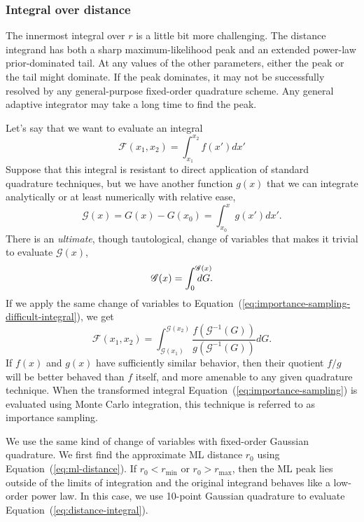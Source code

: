 \documentclass[amsmath,amssymb,aps,prx,reprint,nopreprintnumbers,nofootinbib]{revtex4-1}
\def\mathrlap{\mathpalette\mathrlapinternal}
\def\mathrlapinternal#1#2{\rlap{$\mathsurround=0pt#1{#2}$}}
\begin{document}
\subsubsection{Integral over distance}

The innermost integral over $r$ is a little bit more challenging. The distance integrand has both a sharp maximum\nobreakdashes-likelihood peak and an extended power\nobreakdashes-law prior\nobreakdashes-dominated tail. At any values of the other parameters, either the peak or the tail might dominate. If the peak dominates, it may not be successfully resolved by any general\nobreakdashes-purpose fixed\nobreakdashes-order quadrature scheme. Any general adaptive integrator may take a long time to find the peak.

Let's say that we want to evaluate an integral
%
\begin{equation}\label{eq:importance-sampling-difficult-integral}
    \mathscr{F}(x_1, x_2) = \int_{x_1}^{x_2} f(x') dx'
\end{equation}
%
Suppose that this integral is resistant to direct application of standard quadrature techniques, but we have another function $g(x)$ that we can integrate analytically or at least numerically with relative ease,
%
\begin{equation}
    \mathscr{G}(x) = G(x) - G(x_0) = \int_{x_0}^x g(x') dx'.
\end{equation}
%
There is an \emph{ultimate}, though tautological, change of variables that makes it trivial to evaluate $\mathscr{G}(x)$,
%
\begin{equation}
    \mathscr{G}(x) = \int_0^{\mathrlap{\mathscr{G}(x)}} dG.
\end{equation}
%
If we apply the same change of variables to Equation~(\ref{eq:importance-sampling-difficult-integral}), we get
%
\begin{equation}\label{eq:importance-sampling}
    \mathscr{F}(x_1, x_2) = \int_{\mathscr{G}(x_1)}^{\mathscr{G}(x_2)} \frac{f(\mathscr{G}^{-1}(G))}{g(\mathscr{G}^{-1}(G))} dG.
\end{equation}
%
If $f(x)$ and $g(x)$ have sufficiently similar behavior, then their quotient $f/g$ will be better behaved than $f$ itself, and more amenable to any given quadrature technique. When the transformed integral Equation~(\ref{eq:importance-sampling}) is evaluated using Monte Carlo integration, this technique is referred to as importance sampling.

We use the same kind of change of variables with fixed\nobreakdashes-order Gaussian quadrature. We first find the approximate \ac{ML} distance $r_0$ using Equation~(\ref{eq:ml-distance}). If $r_0 < r_\mathrm{min}$ or $r_0 > r_\mathrm{max}$, then the ML peak lies outside of the limits of integration and the original integrand behaves like a low-order power law. In this case, we use 10\nobreakdashes-point Gaussian quadrature to evaluate Equation~(\ref{eq:distance-integral}).
\end{document}
